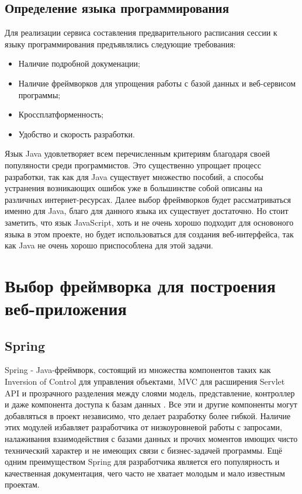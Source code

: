 \subsection{Определение языка программирования}
Для реализации сервиса составления предварительного расписания сессии к языку программирования предъявлялись следующие требования:
\begin{itemize}
\item Наличие подробной докуменации;
\item Наличие фреймворков для упрощения работы с базой данных и веб-сервисом программы;
\item Кроссплатформенность;
\item Удобство и скорость разработки.
\end{itemize}

Язык Java удовлетворяет всем перечисленным критериям благодаря своей популяности среди программистов. Это существенно упрощает процесс разработки, так как для Java существует множество пособий, а способы устранения возникающих ошибок уже в большинстве собой описаны на различных интернет-ресурсах. Далее выбор фреймворков будет рассматриваться именно для Java, благо для данного языка их существует достаточно. Но стоит заметить, что язык JavaScript, хоть и не очень хорошо подходит для основоного языка в этом проекте, но будет использоваться для создания веб-интерфейса, так как Java не очень хорошо приспособлена для этой задачи.

\section{Выбор фреймворка для построения веб-приложения}
\subsection{Spring}
Spring - Java-фреймворк, состоящий из множества компонентов таких как Inversion of Control для управления объектами, MVC для расширения Servlet API и прозрачного разделения между слоями модель, представление, контроллер и даже компонента доступа к базам данных \cite{spring}. Все эти и другие компоненты могут добавляться в проект независимо, что делает разработку более гибкой. Наличие этих модулей избавляет разработчика от низкоуровневой работы с запросами, налаживания взаимодействия с базами данных и прочих моментов имющих чисто технический характер и не имеющих связи с бизнес-задачей программы. Ещё одним преимуществом Spring  для разработчика является его популярность и качественная документация, чего часто не хватает молодым и мало известным проектам.

